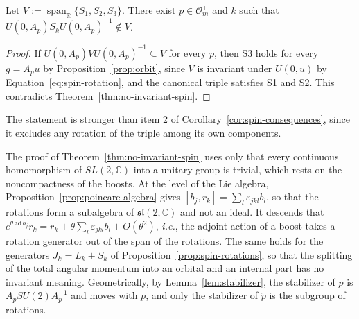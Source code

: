 \begin{corollary}\label{cor:spin-span}
	Let $V:=\operatorname{span}_{\mathbb{R}}\{S_1,S_2,S_3\}$. There exist $p\in\mathcal{O}_m^+$ and $k$ such that $U(0,A_p)S_kU(0,A_p)^{-1}\notin V$.
\end{corollary}

\begin{proof}
	If $U(0,A_p)VU(0,A_p)^{-1}\subseteq V$ for every $p$, then S3 holds for every $g=A_pu$ by Proposition~\ref{prop:orbit}, since $V$ is invariant under $U(0,u)$ by Equation~\eqref{eq:spin-rotation}, and the canonical triple satisfies S1 and S2. This contradicts Theorem~\ref{thm:no-invariant-spin}.
\end{proof}

\noindent The statement is stronger than item 2 of Corollary~\ref{cor:spin-consequences}, since it excludes any rotation of the triple among its own components.

\begin{remark}\label{rem:spin-lie-algebra}
	The proof of Theorem~\ref{thm:no-invariant-spin} uses only that every continuous homomorphism of $SL(2,\mathbb{C})$ into a unitary group is trivial, which rests on the noncompactness of the boosts. At the level of the Lie algebra, Proposition~\ref{prop:poincare-algebra} gives $[b_j,r_k]=\sum_l\varepsilon_{jkl}b_l$, so that the rotations form a subalgebra of $\mathfrak{sl}(2,\mathbb{C})$ and not an ideal. It descends that $e^{\theta\,\mathrm{ad}\,b_j}r_k=r_k+\theta\sum_l\varepsilon_{jkl}b_l+O(\theta^2)$, \textit{i.e.}, the adjoint action of a boost takes a rotation generator out of the span of the rotations. The same holds for the generators $J_k=L_k+S_k$ of Proposition~\ref{prop:spin-rotations}, so that the splitting of the total angular momentum into an orbital and an internal part has no invariant meaning. Geometrically, by Lemma~\ref{lem:stabilizer}, the stabilizer of $p$ is $A_pSU(2)A_p^{-1}$ and moves with $p$, and only the stabilizer of $\mathring{p}$ is the subgroup of rotations.
\end{remark}

